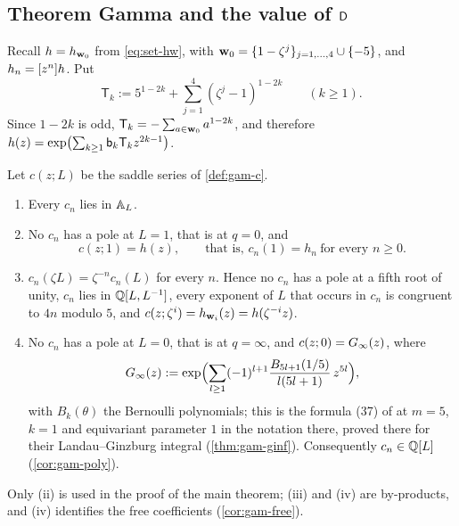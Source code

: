 
\subsection{Theorem Gamma and the value of \texorpdfstring{$\mathsf{D}$}{D}}
\label{sec:gam-thm}

Recall $h=h_{\mathbf{w}_0}$ from \eqref{eq:set-hw}, with $\mathbf{w}_0=\{1-\zeta^j\}_{j=1,\dots,4}\cup\{-5\}$, and $h_n=[z^n]h$. Put
\[
\mathsf T_k:=5^{1-2k}+\sum_{j=1}^4(\zeta^j-1)^{1-2k}\qquad(k\geq 1).
\]
Since $1-2k$ is odd, $\mathsf T_k=-\sum_{a\in\mathbf{w}_0}a^{1-2k}$, and therefore $h(z)=\exp\bigl(\sum_{k\geq 1}\mathsf{b}_k\mathsf T_kz^{2k-1}\bigr)$.

\begin{thm}
\label{thm:gam-main}
Let $c(z;L)$ be the saddle series of \cref{def:gam-c}.
\begin{enumerate}
\item Every $c_n$ lies in $\mathbb{A}_{L}$.
\item No $c_n$ has a pole at $L=1$, that is at $q=0$, and
\begin{equation}
\tag{$\Gamma$}
\label{eq:gam-Gamma}
c(z;1)=h(z),\qquad\text{that is, }c_n(1)=h_n\ \text{for every }n\geq 0.
\end{equation}
\item $c_n(\zeta L)=\zeta^{-n}c_n(L)$ for every $n$. Hence no $c_n$ has a pole at a fifth root of unity, $c_n$ lies in $\mathbb{Q}[L,L^{-1}]$, every exponent of $L$ that occurs in $c_n$ is congruent to $4n$ modulo $5$, and $c(z;\zeta^i)=h_{\mathbf{w}_i}(z)=h(\zeta^{-i}z)$.
\item No $c_n$ has a pole at $L=0$, that is at $q=\infty$, and $c(z;0)=G_{\infty}(z)$, where
\[
G_{\infty}(z):=\exp\Bigl(\sum_{l\geq 1}(-1)^{l+1}\frac{B_{5l+1}(1/5)}{l(5l+1)}\,z^{5l}\Bigr),
\]
with $B_k(\theta)$ the Bernoulli polynomials; this is the formula (37) of \cite[Lemma~7.7]{GJR18} at $m=5$, $k=1$ and equivariant parameter $1$ in the notation there, proved there for their Landau--Ginzburg integral (\cref{thm:gam-ginf}). Consequently $c_n\in\mathbb{Q}[L]$ (\cref{cor:gam-poly}).
\end{enumerate}
\end{thm}

Only (ii) is used in the proof of the main theorem; (iii) and (iv) are by-products, and (iv) identifies the free coefficients (\cref{cor:gam-free}).

